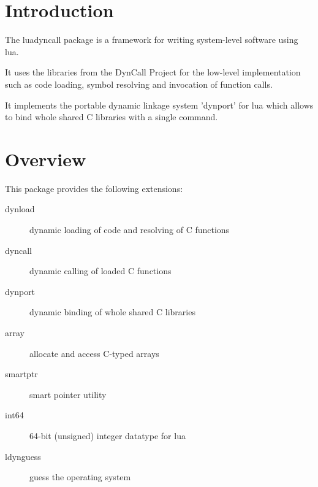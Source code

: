 \documentclass{article}
\begin{document}
\section{Introduction}

The luadyncall package is a framework for writing system-level software
using lua.

It uses the libraries from the DynCall Project for the low-level implementation
such as code loading, symbol resolving and invocation of function calls.

It implements the portable dynamic linkage system 'dynport' for lua which
allows to bind whole shared C libraries with a single command.

\section{Overview}

This package provides the following extensions:

\begin{description}
\item [dynload]   dynamic loading of code and resolving of C functions
\item [dyncall]   dynamic calling of loaded C functions
\item [dynport]   dynamic binding of whole shared C libraries
\item [array]     allocate and access C-typed arrays
\item [smartptr]  smart pointer utility
\item [int64]     64-bit (unsigned) integer datatype for lua
\item [ldynguess] guess the operating system
\end{description}
\end{document}

